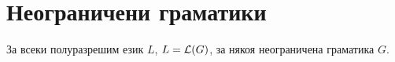 \section{Неограничени граматики}


\begin{lemma}
  За всеки полуразрешим език $L$, $L = \mathcal{L}(G)$, за някоя неограничена граматика $G$.  
\end{lemma}
